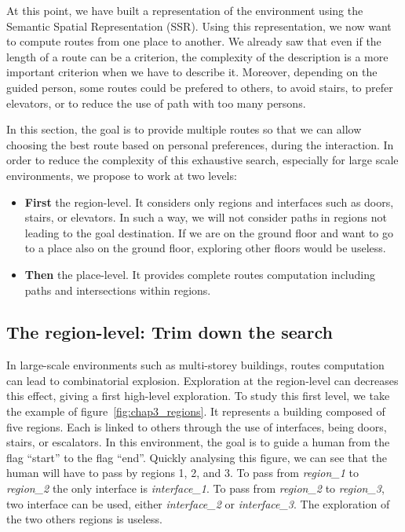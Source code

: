 At this point, we have built a representation of the environment using the Semantic Spatial Representation (SSR). Using this representation, we now want to compute routes from one place to another. We already saw that even if the length of a route can be a criterion, the complexity of the description is a more important criterion when we have to describe it. Moreover, depending on the guided person, some routes could be prefered to others, to avoid stairs, to prefer elevators, or to reduce the use of path with too many persons.

In this section, the goal is to provide multiple routes so that we can allow choosing the best route based on personal preferences, during the interaction. In order to reduce the complexity of this exhaustive search, especially for large scale environments, we propose to work at two levels:
\begin{itemize}
\item \textbf{First} the region-level. It considers only regions and interfaces such as doors, stairs, or elevators. In such a way, we will not consider paths in regions not leading to the goal destination. If we are on the ground floor and want to go to a place also on the ground floor, exploring other floors would be useless.
\item \textbf{Then} the place-level. It provides complete routes computation including paths and intersections within regions.
\end{itemize}

\subsection{The region-level: Trim down the search}

In large-scale environments such as multi-storey buildings, routes computation can lead to combinatorial explosion. Exploration at the region-level can decreases this effect, giving a first high-level exploration. To study this first level, we take the example of figure~\ref{fig:chap3_regions}. It represents a building composed of five regions. Each is linked to others through the use of interfaces, being doors, stairs, or escalators. In this environment, the goal is to guide a human from the flag ``start'' to the flag ``end''. Quickly analysing this figure, we can see that the human will have to pass by regions 1, 2, and 3. To pass from \textit{region\_1} to \textit{region\_2} the only interface is \textit{interface\_1}. To pass from \textit{region\_2} to \textit{region\_3}, two interface can be used, either \textit{interface\_2} or \textit{interface\_3}. The exploration of the two others regions is useless.

